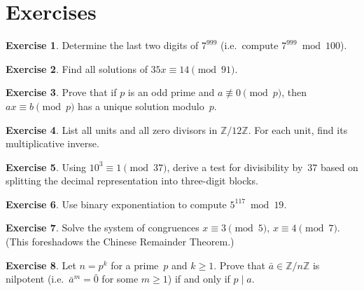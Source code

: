\documentclass[12pt,a4paper,openany]{book}
\theoremstyle{definition}
\newtheorem{exercise}{Exercise}[chapter]
\theoremstyle{plain}
\theoremstyle{remark}
\newcommand{\Z}{\mathbb{Z}}
\begin{document}
\section{Exercises}
\label{sec:ch3-exercises}

\begin{exercise}
\label{exer:cong-basic}
Determine the last two digits of $7^{999}$ (i.e.\ compute $7^{999} \bmod 100$).
\end{exercise}

\begin{exercise}
\label{exer:linear-cong-1}
Find all solutions of $35x \equiv 14 \pmod{91}$.
\end{exercise}

\begin{exercise}
\label{exer:linear-cong-2}
Prove that if $p$ is an odd prime and $a \not\equiv 0 \pmod{p}$, then
$ax \equiv b \pmod{p}$ has a unique solution modulo~$p$.
\end{exercise}

\begin{exercise}
\label{exer:ZnZ-units}
List all units and all zero divisors in $\Z/12\Z$.  For each unit, find
its multiplicative inverse.
\end{exercise}

\begin{exercise}
\label{exer:divisibility-37}
Using $10^3 \equiv 1 \pmod{37}$, derive a test for divisibility by~$37$
based on splitting the decimal representation into three-digit blocks.
\end{exercise}

\begin{exercise}
\label{exer:fast-exp}
Use binary exponentiation to compute $5^{117} \bmod 19$.
\end{exercise}

\begin{exercise}
\label{exer:system-cong}
Solve the system of congruences $x \equiv 3 \pmod{5}$, $x \equiv 4 \pmod{7}$.
(This foreshadows the Chinese Remainder Theorem.)
\end{exercise}

\begin{exercise}
\label{exer:nilpotent}
Let $n = p^k$ for a prime~$p$ and $k \ge 1$.  Prove that $\bar{a} \in \Z/n\Z$
is nilpotent (i.e.\ $\bar{a}^m = \bar{0}$ for some $m \ge 1$) if and only
if $p \mid a$.
\end{exercise}
\end{document}
